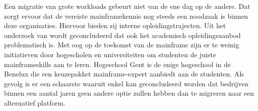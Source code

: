Een migratie van grote workloads gebeurt niet van de ene dag op de andere. Dat zorgt ervoor dat de vereiste mainframekennis nog steeds een noodzaak is binnen deze organisaties. Hiervoor bieden zij interne opleidingstrajecten. Uit het onderzoek van \textcite{2020} wordt geconcludeerd dat ook het academisch opleidingsaanbod problematisch is. Met oog op de toekomst van de mainframe zijn er te weinig initiatieven door hogescholen en universiteiten om studenten de juiste mainframeskills aan te leren. Hogeschool Gent is de enige hogeschool in de Benelux die een keuzepakket mainframe-expert aanbiedt aan de studenten. Als gevolg is er een schaarste waaruit enkel kan geconcludeerd worden dat bedrijven binnen een aantal jaren geen andere optie zullen hebben dan te migreren naar een alternatief platform. 

